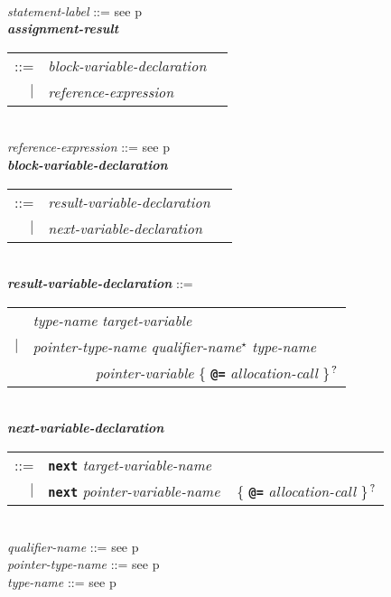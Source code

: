 \documentclass[12pt]{article}
\newcommand{\TT}[1]{{\tt \bfseries #1}}
\newcommand{\STAR}{{\Large $^\star$}}
\newcommand{\QMARK}{{$^{\,\mbox{\footnotesize ?}}$}}
\newcommand{\ttkey}[1]{{\tt \bfseries #1}}
\newcommand{\emkey}[1]{{\em \bfseries #1}}
\newcommand{\pagref}[1]{p\pageref{#1}}
\newenvironment{indpar}[1][0.3in]%
	{\begin{list}{}%
		     {\setlength{\itemsep}{0in}%
		      \setlength{\topsep}{0in}%
		      \setlength{\parsep}{1ex}%
		      \setlength{\labelwidth}{#1}%
		      \setlength{\leftmargin}{#1}%
		      \addtolength{\leftmargin}{\labelsep}}%
	 \item}%
	{\end{list}}
\begin{document}
\begin{indpar}
\\[0.5ex]
{\em statement-label} ::= see \pagref{STATEMENT-LABEL}
\\[0.5ex]
\emkey{assignment-result}\label{ASSIGNMENT-RESULT}
    \begin{tabular}[t]{@{}rll}
    ::= & {\em block-variable-declaration} \\
    $|$ & {\em reference-expression}
    \end{tabular}
\\[0.5ex]
{\em reference-expression} ::= see \pagref{REFERENCE-EXPRESSIONS}
\\[0.5ex]
\emkey{block-variable-declaration}\label{BLOCK-VARIABLE-DECLARATION}
    \begin{tabular}[t]{@{}rll}
    ::= & {\em result-variable-declaration} \\
    $|$ & {\em next-variable-declaration} \\
    \end{tabular}
\\[0.5ex]
\emkey{result-variable-declaration}\label{RESULT-VARIABLE-DECLARATION} ::= \\
\hspace*{0.5in}\begin{tabular}{rl}
	    & {\em type-name} {\em target-variable} \\
	$|$ & {\em pointer-type-name} {\em qualifier-name}\STAR{}
	      {\em type-name} \\
	    & ~~~~~~~~ {\em pointer-variable}
	               \{ \TT{@=} {\em allocation-call} \}\QMARK{} \\
	\end{tabular}
\\[0.5ex]
\emkey{next-variable-declaration}\label{NEXT-VARIABLE-DECLARATION} \\
\hspace*{0.5in}\begin{tabular}{rl}
      ::= & \ttkey{next} {\em target-variable-name} \\
      $|$ & \ttkey{next} {\em pointer-variable-name}
	      ~ \{ \TT{@=} {\em allocation-call} \}\QMARK{} \\
      \end{tabular}
\\[0.5ex]
{\em qualifier-name} ::= see \pagref{QUALIFIER-NAME}
\\[0.5ex]
{\em pointer-type-name} ::= see \pagref{POINTER-TYPE-NAME}
\\[0.5ex]
{\em type-name} ::= see \pagref{TYPE-NAME}
\\[0.5ex]

\end{indpar}
\end{document}
